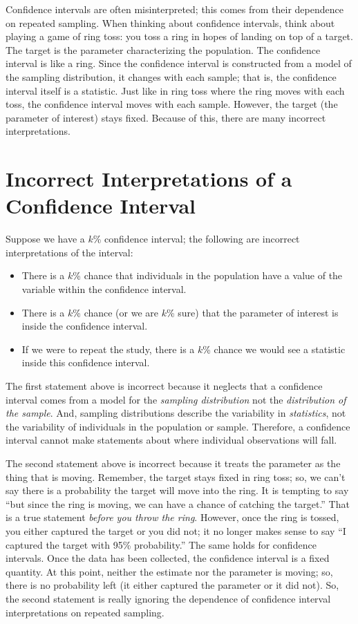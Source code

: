 \documentclass[
  letterpaper,
  DIV=11,
  numbers=noendperiod]{scrreprt}
\providecommand{\tightlist}{%
  \setlength{\itemsep}{0pt}\setlength{\parskip}{0pt}}\usepackage{longtable,booktabs,array}
\theoremstyle{plain}
\theoremstyle{definition}
\theoremstyle{definition}
\theoremstyle{remark}
\begin{document}
Confidence intervals are often misinterpreted; this comes from their
dependence on repeated sampling. When thinking about confidence
intervals, think about playing a game of ring toss: you toss a ring in
hopes of landing on top of a target. The target is the parameter
characterizing the population. The confidence interval is like a ring.
Since the confidence interval is constructed from a model of the
sampling distribution, it changes with each sample; that is, the
confidence interval itself is a statistic. Just like in ring toss where
the ring moves with each toss, the confidence interval moves with each
sample. However, the target (the parameter of interest) stays fixed.
Because of this, there are many incorrect interpretations.

\section{Incorrect Interpretations of a Confidence
Interval}\label{incorrect-interpretations-of-a-confidence-interval}

Suppose we have a \(k\)\% confidence interval; the following are
incorrect interpretations of the interval:

\begin{itemize}
\tightlist
\item
  There is a \(k\)\% chance that individuals in the population have a
  value of the variable within the confidence interval.
\item
  There is a \(k\)\% chance (or we are \(k\)\% sure) that the parameter
  of interest is inside the confidence interval.
\item
  If we were to repeat the study, there is a \(k\)\% chance we would see
  a statistic inside this confidence interval.
\end{itemize}

The first statement above is incorrect because it neglects that a
confidence interval comes from a model for the \emph{sampling
distribution} not the \emph{distribution of the sample}. And, sampling
distributions describe the variability in \emph{statistics}, not the
variability of individuals in the population or sample. Therefore, a
confidence interval cannot make statements about where individual
observations will fall.

The second statement above is incorrect because it treats the parameter
as the thing that is moving. Remember, the target stays fixed in ring
toss; so, we can't say there is a probability the target will move into
the ring. It is tempting to say ``but since the ring is moving, we can
have a chance of catching the target.'' That is a true statement
\emph{before you throw the ring}. However, once the ring is tossed, you
either captured the target or you did not; it no longer makes sense to
say ``I captured the target with 95\% probability.'' The same holds for
confidence intervals. Once the data has been collected, the confidence
interval is a fixed quantity. At this point, neither the estimate nor
the parameter is moving; so, there is no probability left (it either
captured the parameter or it did not). So, the second statement is
really ignoring the dependence of confidence interval interpretations on
repeated sampling.
\end{document}
